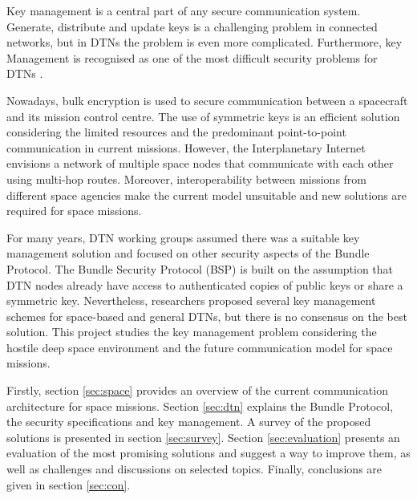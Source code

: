 Key management is a central part of any secure communication system. Generate, distribute and update keys is a challenging problem in connected networks, but in DTNs the problem is even more complicated. Furthermore, key Management is recognised as one of the most difficult security problems for DTNs  \cite{menesidou2017cryptographic}.

Nowadays, bulk encryption is used to secure communication between a spacecraft and its mission control centre. The use of symmetric keys is an efficient solution considering the limited resources and the predominant point-to-point communication in current missions. However, the Interplanetary Internet envisions a network of multiple space nodes that communicate with each other using multi-hop routes. Moreover, interoperability between missions from different space agencies make the current model unsuitable and new solutions are required for space missions.


For many years, DTN working groups assumed there was a suitable key management solution and focused on other security aspects of the Bundle Protocol. The Bundle Security Protocol (BSP) \cite{ietf-dtn-bpsec-07} is built on the assumption that DTN nodes already have access to authenticated copies of public keys or share a symmetric key. Nevertheless, researchers proposed several key management schemes for space-based and general DTNs, but there is no consensus on the best solution. This project studies the key management problem considering the hostile deep space environment and the future communication model for space missions. 


Firstly, section \ref{sec:space} provides an overview of the current communication architecture for space missions. Section \ref{sec:dtn} explains the Bundle Protocol, the security specifications and key management. A survey of the proposed solutions is presented in section \ref{sec:survey}. Section \ref{sec:evaluation} presents an evaluation of the most promising solutions and suggest a way to improve them, as well as challenges and discussions on selected topics. Finally, conclusions are given in section \ref{sec:con}. 




